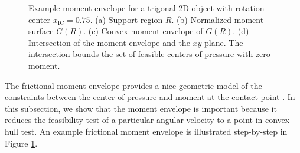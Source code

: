 \documentclass[conference]{IEEEtran}
\newcommand{\EH}[1]{{\color{blue} {Eric: {#1}}  }}
\begin{document}
\begin{figure}[t]
\begin{subfigure}[b]{0.24\textwidth}
    \caption{}
  \end{subfigure}
  \caption{Example moment envelope for a trigonal 2D object with
    rotation center $x_{\text{IC}} = 0.75$. (a) Support region
    $R$. (b) Normalized-moment surface $G(R)$. (c) Convex moment
    envelope of $G(R)$. (d) Intersection of the moment envelope and
    the $xy$-plane. The intersection bounds the set of feasible
    centers of pressure with zero moment.}
  \label{fig:moment-envelope}
\end{figure}


The frictional moment envelope provides a nice geometric model of the
constraints between the center of pressure and moment at the contact
point \cite{Mason}. In this subsection, we show that the moment
envelope is important because it reduces the feasibility test of a
particular angular velocity to a point-in-convex-hull test.
An example frictional moment envelope is illustrated step-by-step in
Figure \ref{fig:moment-envelope}.
\end{document}
